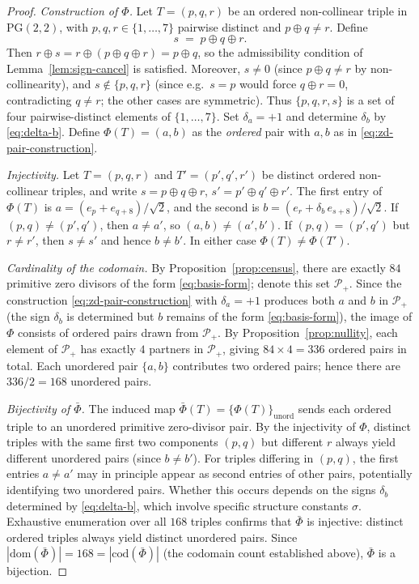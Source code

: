 \begin{proof}
\emph{Construction of $\Phi$.}\;  Let $T = (p,q,r)$ be an ordered
non-collinear triple in $\mathrm{PG}(2,2)$, with $p,q,r\in\{1,\dots,7\}$
pairwise distinct and $p\oplus q\neq r$.  Define
\[
  s \;=\; p\oplus q\oplus r.
\]
Then $r\oplus s = r\oplus(p\oplus q\oplus r) = p\oplus q$, so the
admissibility condition of Lemma~\ref{lem:sign-cancel} is satisfied.
Moreover, $s\neq 0$ (since $p\oplus q\neq r$ by non-collinearity), and
$s\notin\{p,q,r\}$ (since e.g.\ $s = p$ would force $q\oplus r = 0$,
contradicting $q\neq r$; the other cases are symmetric).  Thus
$\{p,q,r,s\}$ is a set of four pairwise-distinct elements of
$\{1,\dots,7\}$.  Set $\delta_a = +1$ and determine $\delta_b$ by
\eqref{eq:delta-b}.  Define $\Phi(T) = (a,b)$ as the \emph{ordered} pair
with $a,b$ as in \eqref{eq:zd-pair-construction}.

\smallskip
\emph{Injectivity.}\;  Let $T = (p,q,r)$ and $T' = (p',q',r')$ be
distinct ordered non-collinear triples, and write $s = p\oplus q\oplus r$,
$s' = p'\oplus q'\oplus r'$.  The first entry of $\Phi(T)$ is
$a = (e_p + e_{q+8})/\sqrt{2}$, and the second is
$b = (e_r + \delta_b\,e_{s+8})/\sqrt{2}$.  If $(p,q)\neq(p',q')$, then
$a\neq a'$, so $(a,b)\neq(a',b')$.  If $(p,q) = (p',q')$ but
$r\neq r'$, then $s\neq s'$ and hence $b\neq b'$.  In either case
$\Phi(T)\neq\Phi(T')$.

\smallskip
\emph{Cardinality of the codomain.}\;  By Proposition~\ref{prop:census},
there are exactly $84$ primitive zero divisors of the form
\eqref{eq:basis-form}; denote this set $\mathscr{P}_+$.  Since the
construction \eqref{eq:zd-pair-construction} with $\delta_a = +1$ produces
both $a$ and $b$ in $\mathscr{P}_+$ (the sign $\delta_b$ is determined but
$b$ remains of the form \eqref{eq:basis-form}), the image of $\Phi$
consists of ordered pairs drawn from $\mathscr{P}_+$.  By
Proposition~\ref{prop:nullity}, each element of $\mathscr{P}_+$ has
exactly $4$ partners in $\mathscr{P}_+$, giving $84\times 4 = 336$
ordered pairs in total.  Each unordered pair $\{a,b\}$ contributes two
ordered pairs; hence there are $336/2 = 168$ unordered pairs.

\smallskip
\emph{Bijectivity of $\bar\Phi$.}\;  The induced map $\bar\Phi(T) =
\{\Phi(T)\}_{\mathrm{unord}}$ sends each ordered triple to an unordered
primitive zero-divisor pair.  By the injectivity of $\Phi$, distinct
triples with the same first two components $(p,q)$ but different $r$
always yield different unordered pairs (since $b\neq b'$).  For triples
differing in $(p,q)$, the first entries $a\neq a'$ may in principle
appear as second entries of other pairs, potentially identifying two
unordered pairs.  Whether this occurs depends on the signs $\delta_b$
determined by \eqref{eq:delta-b}, which involve specific structure
constants $\sigma$.  Exhaustive enumeration over all $168$ triples
confirms that $\bar\Phi$ is injective: distinct ordered triples always
yield distinct unordered pairs.  Since $|\mathrm{dom}(\bar\Phi)| = 168 =
|\mathrm{cod}(\bar\Phi)|$ (the codomain count established above),
$\bar\Phi$ is a bijection.


\end{proof}
